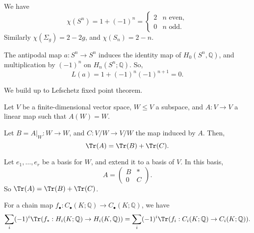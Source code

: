 \documentclass[12pt]{article}
\begin{document}
\begin{exbox}
	We have
	\[
	\chi(S^n) = 1 + (-1)^n =
	\begin{cases}
		2 & n \text{ even},\\
		0 & n \text{ odd}.
	\end{cases}
	\]
	Similarly $\chi(\Sigma_g) = 2 - 2g$, and $\chi(S_n) = 2 - n$.
\end{exbox}

\begin{exbox}
	The antipodal map $a : S^n \to S^n$ induces the identity map of $H_0(S^n, \mathbb{Q})$, and multiplication by $(-1)^n$ on $H_n(S^n; \mathbb{Q})$. So,
	\[
	L(a) = 1 + (-1)^n (-1)^{n+1} = 0.
	\]
\end{exbox}

We build up to Lefschetz fixed point theorem.

\begin{lemma}
	Let $V$ be a finite-dimensional vector space, $W \leq V$ a subspace, and $A : V \to V$ a linear map such that $A(W) = W$.

	Let $B = A|_W : W \to W$, and $C : V/W \to V/W$ the map induced by $A$. Then,
	\[
	\Tr(A) = \Tr(B) + \Tr(C).
	\]
\end{lemma}

\begin{proofbox}
	Let $e_1, \ldots, e_r$ be a basis for $W$, and extend it to a basis of $V$. In this basis,
	\[
	A = 
	\begin{pmatrix}
		B & * \\
		0 & C
	\end{pmatrix}.
	\]
	So $\Tr(A) = \Tr(B) + \Tr(C)$.
\end{proofbox}

\begin{corollary}
	For a chain map $f_\bullet : C_\bullet(K; \mathbb{Q}) \to C_\bullet(K; \mathbb{Q})$, we have
	\[
	\sum_i (-1)^i \Tr(f_\ast : H_i(K; \mathbb{Q}) \to H_i(K, \mathbb{Q})) = \sum_i (-1)^i \Tr(f_i : C_i(K; \mathbb{Q}) \to C_i(K; \mathbb{Q})).
	\]
\end{corollary}
\end{document}
